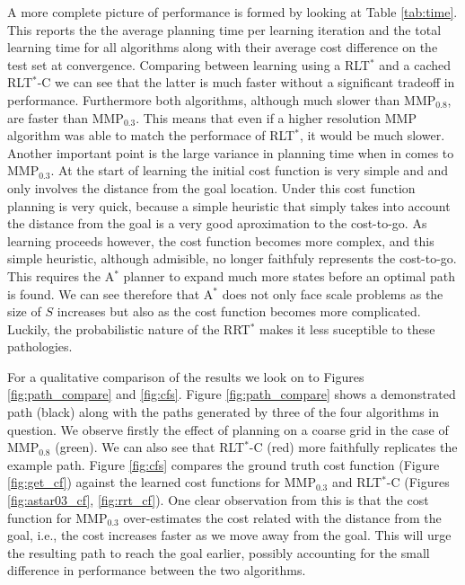 \documentclass{article}  %
\begin{document}
	A more complete picture of performance is formed by looking at Table \ref{tab:time}. This reports the the average planning time per learning iteration and the total learning time for all algorithms along with their average cost difference on the test set at convergence. Comparing between learning using a RLT$^*$ and a cached RLT$^*$-C we can see that the latter is much faster without a significant tradeoff in performance. Furthermore both algorithms, although much slower than MMP$_{0.8}$, are faster than MMP$_{0.3}$. This means that even if a higher resolution MMP algorithm was able to match the performace of RLT$^*$, it would be much slower. Another important point is the large variance in planning time when in comes to MMP$_{0.3}$. At the start of learning the initial cost function is very simple and and only involves the distance from the goal location. Under this cost function planning is very quick, because a simple heuristic that simply takes into account the distance from the goal is a very good aproximation to the cost-to-go. As learning proceeds however, the cost function becomes more complex, and this simple heuristic, although admisible, no longer faithfuly represents the cost-to-go. This requires the A$^*$ planner to expand much more states before an optimal path is found. We can see therefore that A$^*$ does not only face scale problems as the size of $S$ increases but also as the cost function becomes more complicated. Luckily, the probabilistic nature of the RRT$^*$ makes it less suceptible to these pathologies.  

	For a qualitative comparison of the results we look on to Figures \ref{fig:path_compare} and \ref{fig:cfs}. Figure \ref{fig:path_compare} shows a demonstrated path (black) along with the paths generated by three of the four algorithms in question. We observe firstly the effect of planning on a coarse grid in the case of MMP$_{0.8}$ (green). We can also see that RLT$^*$-C (red) more faithfully replicates the example path. Figure \ref{fig:cfs} compares the ground truth cost function (Figure \ref{fig:get_cf}) against the learned cost functions for  MMP$_{0.3}$ and RLT$^*$-C (Figures \ref{fig:astar03_cf}, \ref{fig:rrt_cf}). One clear observation from this is that the cost function  for  MMP$_{0.3}$ over-estimates the cost related with the distance from the goal, i.e., the cost increases faster as we move away from the goal. This will urge the resulting path to reach the goal earlier, possibly accounting for the small difference in performance between the two algorithms. 
\end{document}
